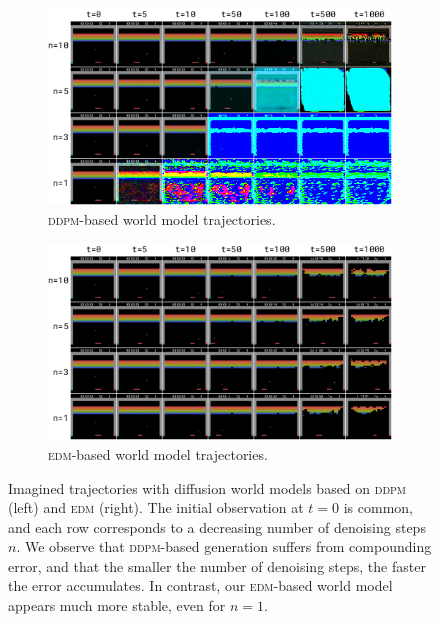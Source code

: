 \begin{figure}[h]
  \begin{subfigure}{0.49\linewidth}
    \includegraphics[width=\linewidth]{images/figure__karras_vs_ddpm__ddpm.png}
    \caption{\textsc{ddpm}-based world model trajectories.} \label{fig:denoising_with_ddpm}
  \end{subfigure}%
  \hspace*{\fill}   %
  \begin{subfigure}{0.49\textwidth}
    \includegraphics[width=\linewidth]{images/figure__karras_vs_ddpm__karras.png}
    \caption{\textsc{edm}-based world model trajectories.} \label{fig:denoising_with_karras}
  \end{subfigure}%

\caption{Imagined trajectories with diffusion world models based on \textsc{ddpm} (left) and \textsc{edm} (right). The initial observation at $t=0$ is common, and each row corresponds to a decreasing number of denoising steps $n$. We observe that \textsc{ddpm}-based generation suffers from compounding error, and that the smaller the number of denoising steps, the faster the error accumulates. In contrast, our \textsc{edm}-based world model appears much more stable, even for $n=1$.\vspace{-5mm}}
\label{fig:denoising_trajectories} 
\end{figure}


